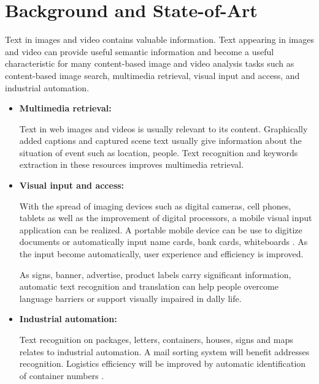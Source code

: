 
\graphicspath{ {1chapterStateOfArt/image/} }
\chapter{Background and State-of-Art} \label{State-of-Art}

\par
Text in images and video contains valuable information. Text appearing in images and video can provide useful semantic information and become a useful characteristic for many content-based image and video analysis tasks such as content-based image search, multimedia retrieval, visual input and access, and industrial automation.

\begin{itemize}
\item{\textbf{Multimedia retrieval:}}

Text in web images and videos is usually relevant to its content. Graphically added captions and captured scene text usually give information about the situation of event such as location, people. Text recognition and keywords extraction in these resources improves multimedia retrieval. 
\item{\textbf{Visual input and access:}}

With the spread of imaging devices such as digital cameras, cell phones, tablets as well as the improvement of digital processors, a mobile visual input application can be realized. A portable mobile device can be use to digitize documents or automatically input name cards, bank cards, whiteboards \cite{}. As the input become automatically, user experience and efficiency is improved. 

As signs, banner, advertise, product labels carry significant information, automatic text recognition and translation can help people overcome language barriers or support visually impaired in dally life. 

\item{\textbf{Industrial automation:}}

Text recognition on packages, letters, containers, houses, signs and maps relates to industrial automation. A mail sorting system will benefit addresses recognition. Logistics efficiency will be improved by automatic identification of container numbers \cite{39}.


\end{itemize}


